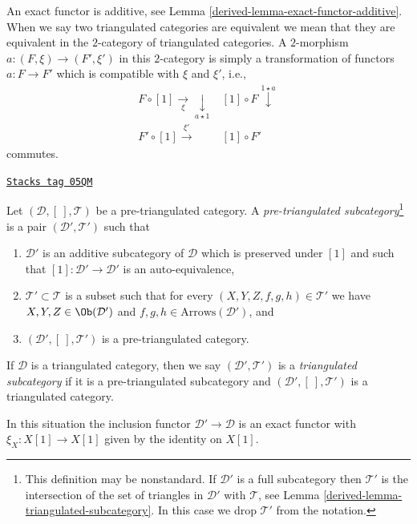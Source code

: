 An exact functor is additive, see
Lemma \ref{derived-lemma-exact-functor-additive}.
When we say two triangulated categories are equivalent we mean that
they are equivalent in the $2$-category of triangulated categories.
A $2$-morphism $a : (F, \xi) \to (F', \xi')$ in this $2$-category is
simply a transformation of functors $a : F \to F'$ which is compatible
with $\xi$ and $\xi'$, i.e.,
$$
\begin{array}{cc}F \circ [1] \underset{\xi}{\longrightarrow}\underset{a \star 1}{\downarrow} & [1] \circ F \overset{1 \star a}{\downarrow} \\ F' \circ [1] \overset{\xi'}{\longrightarrow} & [1] \circ F'\end{array}
$$
commutes.

\begin{definition}
\label{derived-definition-triangulated-subcategory}
\href{https://stacks.math.columbia.edu/tag/05QM}{\texttt{Stacks tag 05QM}}

Let $(\mathcal{D}, [\ ], \mathcal{T})$ be a pre-triangulated category.
A {\it pre-triangulated subcategory}\footnote{This definition may be
nonstandard. If $\mathcal{D}'$ is a full subcategory then $\mathcal{T}'$
is the intersection of the set of triangles in $\mathcal{D}'$ with
$\mathcal{T}$, see
Lemma \ref{derived-lemma-triangulated-subcategory}.
In this case we drop $\mathcal{T}'$ from the notation.}
is a pair $(\mathcal{D}', \mathcal{T}')$ such that
\begin{enumerate}
\item $\mathcal{D}'$ is an additive subcategory of $\mathcal{D}$
which is preserved under $[1]$ and such that
$[1] : \mathcal{D}' \to \mathcal{D}'$ is an auto-equivalence,
\item $\mathcal{T}' \subset \mathcal{T}$ is a subset such that for every
$(X, Y, Z, f, g, h) \in \mathcal{T}'$ we have
$X, Y, Z \in \Ob(\mathcal{D}')$ and
$f, g, h \in \text{Arrows}(\mathcal{D}')$, and
\item $(\mathcal{D}', [\ ], \mathcal{T}')$ is a pre-triangulated
category.
\end{enumerate}
If $\mathcal{D}$ is a triangulated category, then we say
$(\mathcal{D}', \mathcal{T}')$ is a {\it triangulated subcategory} if
it is a pre-triangulated subcategory and
$(\mathcal{D}', [\ ], \mathcal{T}')$ is a triangulated category.
\end{definition}

In this situation the inclusion functor
$\mathcal{D}' \to \mathcal{D}$ is an exact functor
with $\xi_X : X[1] \to X[1]$ given by the identity on $X[1]$.

